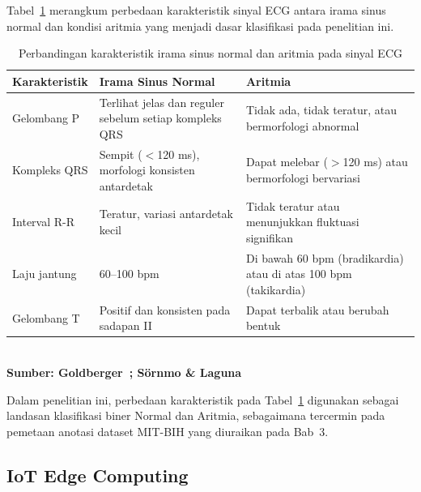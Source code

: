 Tabel~\ref{tab:perbandingan-irama} merangkum perbedaan karakteristik
sinyal ECG antara irama sinus normal dan kondisi aritmia yang menjadi
dasar klasifikasi pada penelitian ini.

\begin{table}[!ht]
  \centering
  \caption{Perbandingan karakteristik irama sinus normal dan aritmia
           pada sinyal ECG}
  \label{tab:perbandingan-irama}
  \small
  \begin{tabular}{|p{3.0cm}|p{4.5cm}|p{4.5cm}|}
    \hline
    \rowcolor{headgray}
    \textbf{Karakteristik} &
    \textbf{Irama Sinus Normal} &
    \textbf{Aritmia} \\
    \hline
    Gelombang P &
    Terlihat jelas dan reguler sebelum setiap kompleks QRS &
    Tidak ada, tidak teratur, atau bermorfologi abnormal \\
    \hline
    Kompleks QRS &
    Sempit ($<$120 ms), morfologi konsisten antardetak &
    Dapat melebar ($>$120 ms) atau bermorfologi bervariasi \\
    \hline
    Interval R-R &
    Teratur, variasi antardetak kecil &
    Tidak teratur atau menunjukkan fluktuasi signifikan \\
    \hline
    Laju jantung &
    60--100 bpm &
    Di bawah 60 bpm (bradikardia) atau di atas 100 bpm (takikardia) \\
    \hline
    Gelombang T &
    Positif dan konsisten pada sadapan II &
    Dapat terbalik atau berubah bentuk \\
    \hline
  \end{tabular}
  \smallskip\\
  \small\textbf{Sumber: Goldberger~\cite{ecg_goldberger}; S\"{o}rnmo \& Laguna~\cite{sornmo_laguna_2005}}
\end{table}

Dalam penelitian ini, perbedaan karakteristik pada
Tabel~\ref{tab:perbandingan-irama} digunakan sebagai landasan klasifikasi
biner Normal dan Aritmia, sebagaimana tercermin pada pemetaan anotasi
dataset MIT-BIH yang diuraikan pada Bab~3.

\subsection{IoT Edge Computing}
\label{subsec:iot-edge}

